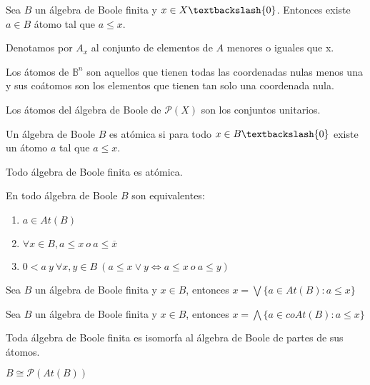 \begin{lema}
    Sea $B$ un álgebra de Boole finita y $x \in X \textbackslash \{0\}$. Entonces existe $a \in B$ átomo tal que $a \leq x$.
\end{lema}
\begin{nota}
    Denotamos por $A_x$ al conjunto de elementos de $A$ menores o iguales que x.
\end{nota}

\begin{ejemplo}
    Los átomos de $\mathbb{B}^n$ son aquellos que tienen todas las coordenadas nulas menos una y sus coátomos son los elementos que tienen tan solo una coordenada nula.
\end{ejemplo}
\begin{ejemplo}
    Los átomos del álgebra de Boole de $\mathcal{P}(X)$ son los conjuntos unitarios.
\end{ejemplo}

\begin{ndef}
    Un álgebra de Boole $B$ es atómica si para todo $x \in B \textbackslash \{0\}$ existe un átomo $a$ tal que $a \leq x$.
\end{ndef}
\begin{nth}
    Todo álgebra de Boole finita es atómica.
\end{nth}
\begin{nth}
    En todo álgebra de Boole $B$ son equivalentes:
    \begin{enumerate}
        \item $a \in At(B)$
        \item $\forall x \in B, a \leq x \ o \ a \leq \overline{x}$
        \item $0 < a \ y \ \forall x,y \in B \ (a \leq x \lor y \Leftrightarrow a \leq x \ o \ a \leq y)$
    \end{enumerate}
\end{nth}
\begin{nth}
    Sea $B$ un álgebra de Boole finita  y $x \in B$, entonces $x = \bigvee \{a \in At(B): a \leq x\}$
\end{nth}
\begin{nth}
    Sea $B$ un álgebra de Boole finita  y $x \in B$, entonces $x = \bigwedge \{a \in coAt(B): a \leq x\}$
\end{nth}

\begin{ncor}
    Toda álgebra de Boole finita es isomorfa al álgebra de Boole de partes de sus átomos.
    \begin{center} $B \cong \mathcal{P} (At(B))$ \end{center}
\end{ncor}

